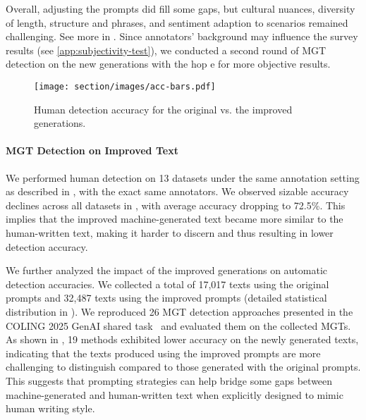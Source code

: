 Overall, adjusting the prompts did fill some gaps, but cultural nuances, diversity of length, structure and phrases, and sentiment adaption to scenarios remained challenging. See more in .
Since annotators' background may influence the survey results (see \ref{app:subjectivity-test}), we conducted a second round of MGT detection on the new generations with the hop   e for more objective results.


\begin{figure}[t!]
    \centering
    \texttt{[image: section/images/acc-bars.pdf]}
    \caption{Human detection accuracy for the original vs. the improved generations.}
    \label{fig:acc-diff}
\end{figure}

\paragraph{MGT Detection on Improved Text}
We performed human detection on 13 datasets under the same annotation setting as described in , with the exact same annotators.
We observed sizable accuracy declines across all datasets in , with average accuracy dropping to 72.5\%.
This implies that the improved machine-generated text became more similar to the human-written text, making it harder to discern and thus resulting in lower detection accuracy.


We further analyzed the impact of the improved generations on automatic detection accuracies.
We collected a total of 17,017 texts using the original prompts and 32,487 texts using the improved prompts (detailed statistical distribution in ).
We reproduced 26 MGT detection approaches presented in the COLING 2025 GenAI shared task~\cite{wang-etal-2025-genai} and evaluated them on the collected MGTs. As shown in , 19 methods exhibited lower accuracy on the newly generated texts, indicating that the texts produced using the improved prompts are more challenging to distinguish compared to those generated with the original prompts.
This suggests that prompting strategies can help bridge some gaps between machine-generated and human-written text when explicitly designed to mimic human writing style.



\begin{comment}
Interestingly, when we explicitly tell annotators that the given text is newly-generated and ask them to analyze whether the gaps have been resolved, they can clearly identified what issues are remained. When they are asked to distinguish between the improved machine-generated text and human-written text, some cases are harder for them to differentiate, leading to lower accuracy.
\end{comment}